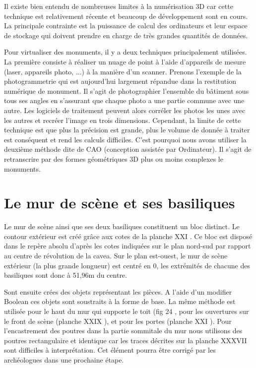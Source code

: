 Il existe bien entendu de nombreuses limites à la numérisation 3D car cette technique est relativement récente et beaucoup de développement sont en cours. La principale contrainte est la puissance de calcul des ordinateurs et leur espace de stockage qui doivent prendre en charge de très grandes quantités de données.

Pour virtualiser des monuments, il y a deux techniques principalement utilisées. La première consiste à réaliser un nuage de point à l'aide d'appareils de mesure (laser, appareils photo, ...) à la manière d'un scanner. Prenons l'exemple de la photogrammetrie qui est aujourd'hui largement répandue dans la restitution numérique de monument. Il s'agit de photographier l'ensemble du bâtiment sous tous ses angles en s'assurant que chaque photo a une partie commune avec une autre. Les logiciels de traitement peuvent alors corréler les photos les unes avec les autres et recréer l'image en trois dimensions. Cependant, la limite de cette technique est que plus la précision est grande, plus le volume de donnée à traiter est conséquent et rend les calculs difficiles. C'est pourquoi nous avons utiliser la deuxième méthode dite de CAO (conception assistée par Ordinateur). Il s'agit de retranscrire par des formes géométriques 3D plus ou moins complexes le monuments.


		\section{Le mur de scène et ses basiliques}

Le mur de scène ainsi que ses deux basiliques constituent un bloc distinct. Le contour extérieur est créé grâce aux cotes de la planche XXI \cite{orangePl}. Ce bloc est disposé dans le repère absolu d'après les cotes indiquées sur le plan nord-sud par rapport au centre de révolution de la cavea. Sur le plan est-ouest, le mur de scène extérieur (la plus grande longueur) est centré en 0, les extrémités de chacune des basiliques sont donc à 51,96m du centre.

Sont ensuite crées des objets représentant les pièces. A l'aide d'un modifier Boolean ces objets sont soustraits à la forme de base. La même méthode est utilisée pour le haut du mur qui supporte le toit (fig 24 \cite{orangeTxt},  pour les ouvertures sur le front de scène (planche XXIX \cite{orangePl}), et pour les portes (planche XXI \cite{orangePl}). Pour l'encastrement des poutres dans la partie sommitale du mur nous utilisons des poutres rectangulaire et identique car les traces décrites sur la planche XXXVII \cite{orangePl} sont difficiles à interprétation. Cet élément pourra être corrigé par les archéologues dans une prochaine étape.

